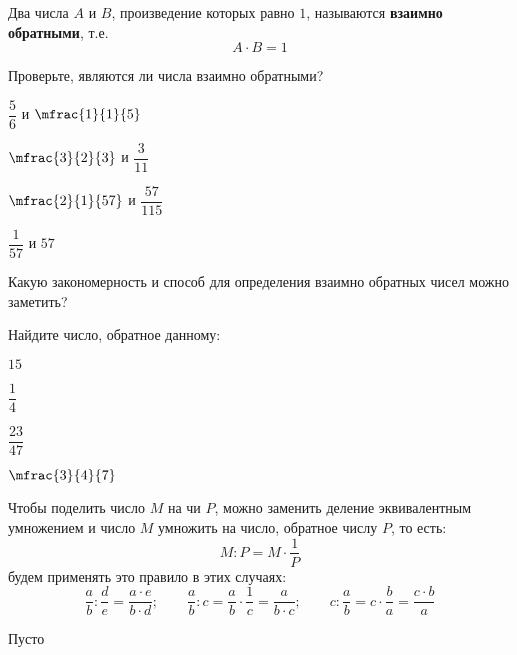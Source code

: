 %
%
%
%
\begin{class}[number=3]
	\begin{definit}
		Два числа \( A \) и \( B \), произведение которых равно \( 1 \), называются \textbf{взаимно обратными}, т.е.
		\[ A \cdot B = 1 \]
	\end{definit}
	\begin{listofex}
		\item Проверьте, являются ли числа взаимно обратными?
		\begin{enumcols}[itemcolumns=4]
			\item \( \dfrac{5}{6} \) и \( \mfrac{1}{1}{5} \)
			\item \( \mfrac{3}{2}{3} \) и \( \dfrac{3}{11} \)
			\item \( \mfrac{2}{1}{57} \) и \( \dfrac{57}{115} \)
			\item \( \dfrac{1}{57} \) и \( 57 \)
		\end{enumcols}
		Какую закономерность и способ для определения взаимно обратных чисел можно заметить?
		\item Найдите число, обратное данному:
		\begin{enumcols}[itemcolumns=4]
			\item \( 15 \)
			\item \( \dfrac{1}{4} \)
			\item \( \dfrac{23}{47} \)
			\item \( \mfrac{3}{4}{7} \)
		\end{enumcols}
	\end{listofex}
	\begin{definit}
		Чтобы поделить число \( M \) на чи \( P \), можно заменить деление эквивалентным умножением и число \( M \) умножить на число, обратное числу \( P \), то есть:
		\[ M:P=M\cdot\dfrac{1}{P} \]
		будем применять это правило в этих случаях:
		\[ 
			\dfrac{a}{b}:\dfrac{d}{e}=\dfrac{a \cdot e}{b \cdot d};
			\qquad
			\dfrac{a}{b}:c=\dfrac{a}{b}\cdot\dfrac{1}{c}=\dfrac{a}{b \cdot c};
			\qquad
			c:\dfrac{a}{b}=c\cdot\dfrac{b}{a}=\dfrac{c \cdot b}{a}
		\]
	\end{definit}
	\begin{listofex}
		\item Пусто
	\end{listofex}
\end{class}
